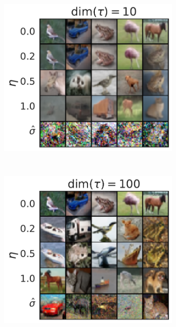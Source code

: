 \begin{figure}
    \centering
    \begin{subfigure}{0.23\textwidth}
    \includegraphics[width=\textwidth]{figures/cifar10-dim10.pdf}
    \end{subfigure}
    ~
    \begin{subfigure}{0.23\textwidth}
    \includegraphics[width=\textwidth]{figures/cifar10-dim100.pdf}
    \end{subfigure}

\end{figure}
